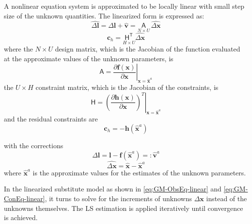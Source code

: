 A nonlinear equation system is approximated to be locally linear with small step size of the unknown quantities. The linearized form is expressed as:
\begin{equation} \label{eq:GM-ObsEq-linear}
\widehat{\Delta\boldsymbol l}=\Delta\boldsymbol l+\widehat{\boldsymbol v}=\underset{N\times U}{\mathsf{A}}\,\widehat{\Delta\boldsymbol x}
\end{equation}
\begin{equation} \label{eq:GM-ConEq-linear}
\boldsymbol c_h=\underset{H\times U}{\mathsf{H^T}}\widehat{\Delta\boldsymbol x}
\end{equation}
where\newline
the $N\times U$ design matrix, which is the Jacobian of the function evaluated at the approximate values of the unknown parameters, is
\begin{equation*}
\mathsf{A}=\left.\dfrac{\partial\boldsymbol f(\boldsymbol x)}{\partial\boldsymbol x}\right|_{\boldsymbol x=\widehat{\boldsymbol x}^a}
\end{equation*}
the $U\times H$ constraint matrix, which is the Jacobian of the constraints, is
\begin{equation*}
\mathsf{H}=\left.\left(\dfrac{\partial\boldsymbol h(\boldsymbol x)}{\partial\boldsymbol x}\right)^T\right|_{\boldsymbol x=\widehat{\boldsymbol x}^a}
\end{equation*}
and the residual constraints are
\begin{equation*}
\boldsymbol c_h=-\boldsymbol h(\widehat{\boldsymbol x}^a)
\end{equation*}

with the corrections
\begin{equation} \label{eq:GM-ObsEq-linear-l}
\Delta\boldsymbol l=\boldsymbol l-\boldsymbol f(\widehat{\boldsymbol x}^a)=:\widehat{\boldsymbol v}^a
\end{equation}
\begin{equation} \label{eq:GM-ObsEq-linear-x}
\widehat{\Delta\boldsymbol x}=\widehat{\boldsymbol x}-\widehat{\boldsymbol x}^a
\end{equation}
where $\widehat{\boldsymbol x}^a$ is the approximate values for the estimates of the unknown parameters.

In the linearized substitute model as shown in \eqref{eq:GM-ObsEq-linear} and \eqref{eq:GM-ConEq-linear}, it turns to solve for the increments of unknowns $\Delta\boldsymbol x$ instead of the unknowns themselves. The LS estimation is applied iteratively until convergence is achieved. 

